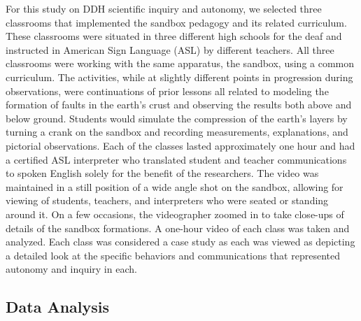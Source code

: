 \documentclass[11.5pt]{sig-alternate} %
\begin{document}
\begin{large}
For this study on DDH scientific inquiry and autonomy, we selected three classrooms that implemented the sandbox pedagogy and its related curriculum. These classrooms were situated in three different high schools for the deaf and instructed in American Sign Language (ASL) by different teachers. All three classrooms were working with the same apparatus, the sandbox, using a common curriculum.  The activities, while at slightly different points in progression during observations, were continuations of prior lessons all related to modeling the formation of faults in the earth’s crust and observing the results both above and below ground.  Students would simulate the compression of the earth’s layers by turning a crank on the sandbox and recording measurements, explanations, and pictorial observations. Each of the classes lasted approximately one hour and had a certified ASL interpreter who translated student and teacher communications to spoken English solely for the benefit of the researchers.   The video was maintained in a still position of a wide angle shot on the sandbox, allowing for viewing of students, teachers, and interpreters who were seated or standing around it.  On a few occasions, the videographer zoomed in to take close-ups of details of the sandbox formations. A one-hour video of each class was taken and analyzed.  Each class was considered a case study as each was viewed as depicting a detailed look at the specific behaviors and communications that represented autonomy and inquiry in each. 

\subsection*{Data Analysis}


\end{large}
\end{document}
